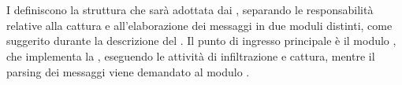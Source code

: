 



\section{\templates{}} \label{sec:code} %




I \templates{} definiscono la struttura che sarà adottata dai \capture{}, separando le responsabilità relative alla cattura e all'elaborazione dei messaggi in due moduli distinti, come suggerito durante la descrizione del \codeagent{}. Il punto di ingresso principale è il modulo \botnet{}, che implementa la \interface{}, eseguendo le attività di infiltrazione e cattura, mentre il parsing dei messaggi viene demandato al modulo \parser{}.

